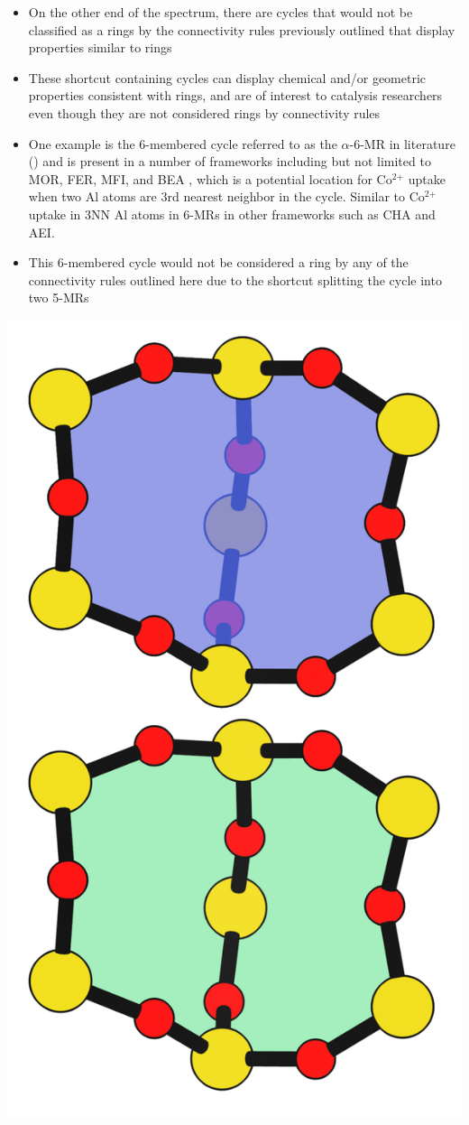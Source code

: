 \documentclass[11pt]{article}
\begin{document}
\begin{itemize}
\item On the other end of the spectrum, there are cycles that would not be classified as a rings by the connectivity rules previously outlined that display properties similar to rings
\item These shortcut containing cycles can display chemical and/or geometric properties consistent with rings, and are of interest to catalysis researchers even though they are not considered rings by connectivity rules
\item One example is the 6-membered cycle referred to as the \(\alpha\)-6-MR in literature () and is present in a number of frameworks including but not limited to  MOR, FER, MFI, and BEA \cite{dedecek-siting-2012,bernauer-proton-2016}, which is a potential location for Co\(^{\text{2+}}\) uptake when two Al atoms are 3rd nearest neighbor in the cycle. Similar to Co\(^{\text{2+}}\) uptake in 3NN Al atoms in 6-MRs in other frameworks such as CHA and AEI.
\item This 6-membered cycle would not be considered a ring by any of the connectivity rules outlined here due to the shortcut splitting the cycle into two 5-MRs
\end{itemize}

\begin{center}
\includegraphics[width=.4\textwidth]{../figures/completed-figures/MFI-6MC.pdf}
\end{center}
\end{document}
